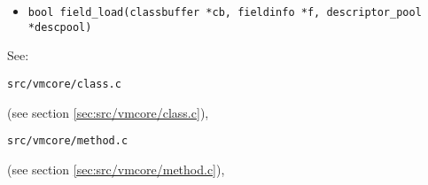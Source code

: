 \documentclass[a4paper, 10pt, titlepage]{scrartcl} %
\begin{document}
\begin{itemize}
 \item \begin{scriptsize}\verb|bool|\hspace{0.0pt}\verb| |\hspace{0.0pt}\verb|field_load|\hspace{0.0pt}\verb|(|\hspace{0.0pt}\verb|classbuffer|\hspace{0.0pt}\verb| |\hspace{0.0pt}\verb||\hspace{0.0pt}\verb|*|\hspace{0.0pt}\verb|cb|\hspace{0.0pt}\verb|,|\hspace{0.0pt}\verb||\hspace{0.0pt}\verb| |\hspace{0.0pt}\verb|fieldinfo|\hspace{0.0pt}\verb| |\hspace{0.0pt}\verb||\hspace{0.0pt}\verb|*|\hspace{0.0pt}\verb|f|\hspace{0.0pt}\verb|,|\hspace{0.0pt}\verb||\hspace{0.0pt}\verb| |\hspace{0.0pt}\verb|descriptor_pool|\hspace{0.0pt}\verb| |\hspace{0.0pt}\verb||\hspace{0.0pt}\verb|*|\hspace{0.0pt}\verb|descpool|\hspace{0.0pt}\verb|)|\hspace{0.0pt}\verb||\end{scriptsize}
\end{itemize}
See: \begin{scriptsize}\verb|src|\hspace{0.0pt}\verb|/|\hspace{0.0pt}\verb|vmcore|\hspace{0.0pt}\verb|/|\hspace{0.0pt}\verb|class|\hspace{0.0pt}\verb|.|\hspace{0.0pt}\verb|c|\end{scriptsize} (see section \ref{sec:src/vmcore/class.c}),
\begin{scriptsize}\verb|src|\hspace{0.0pt}\verb|/|\hspace{0.0pt}\verb|vmcore|\hspace{0.0pt}\verb|/|\hspace{0.0pt}\verb|method|\hspace{0.0pt}\verb|.|\hspace{0.0pt}\verb|c|\end{scriptsize} (see section \ref{sec:src/vmcore/method.c}),
\end{document}
